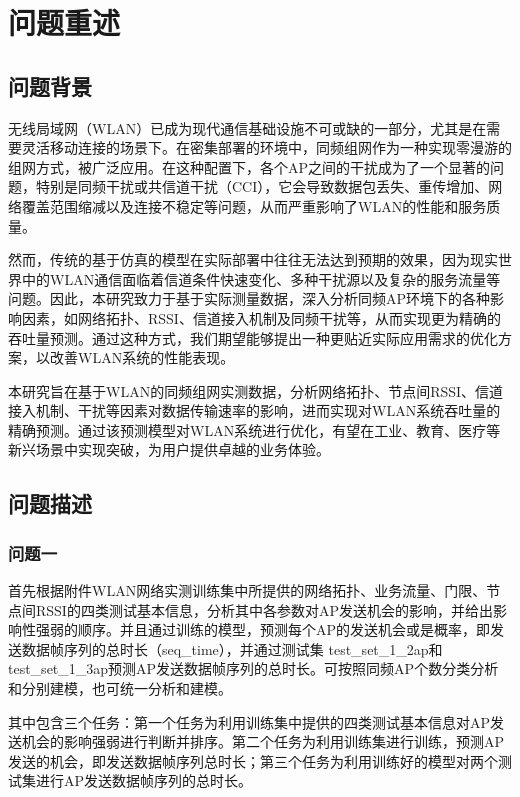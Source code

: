 \section{问题重述}
\subsection{问题背景}   %

无线局域网（WLAN）已成为现代通信基础设施不可或缺的一部分，尤其是在需要灵活移动连接的场景下。在密集部署的环境中，同频组网作为一种实现零漫游的组网方式，被广泛应用。在这种配置下，各个AP之间的干扰成为了一个显著的问题，特别是同频干扰或共信道干扰（CCI），它会导致数据包丢失、重传增加、网络覆盖范围缩减以及连接不稳定等问题，从而严重影响了WLAN的性能和服务质量。

然而，传统的基于仿真的模型在实际部署中往往无法达到预期的效果，因为现实世界中的WLAN通信面临着信道条件快速变化、多种干扰源以及复杂的服务流量等问题。因此，本研究致力于基于实际测量数据，深入分析同频AP环境下的各种影响因素，如网络拓扑、RSSI、信道接入机制及同频干扰等，从而实现更为精确的吞吐量预测。通过这种方式，我们期望能够提出一种更贴近实际应用需求的优化方案，以改善WLAN系统的性能表现。

本研究旨在基于WLAN的同频组网实测数据，分析网络拓扑、节点间RSSI、信道接入机制、干扰等因素对数据传输速率的影响，进而实现对WLAN系统吞吐量的精确预测。通过该预测模型对WLAN系统进行优化，有望在工业、教育、医疗等新兴场景中实现突破，为用户提供卓越的业务体验。

\subsection{问题描述}
\subsubsection{问题一}
首先根据附件WLAN网络实测训练集中所提供的网络拓扑、业务流量、门限、节点间RSSI的四类测试基本信息，分析其中各参数对AP发送机会的影响，并给出影响性强弱的顺序。并且通过训练的模型，预测每个AP的发送机会或是概率，即发送数据帧序列的总时长（seq\_time），并通过测试集 test\_set\_1\_2ap和test\_set\_1\_3ap预测AP发送数据帧序列的总时长。可按照同频AP个数分类分析和分别建模，也可统一分析和建模。

其中包含三个任务：第一个任务为利用训练集中提供的四类测试基本信息对AP发送机会的影响强弱进行判断并排序。第二个任务为利用训练集进行训练，预测AP发送的机会，即发送数据帧序列总时长；第三个任务为利用训练好的模型对两个测试集进行AP发送数据帧序列的总时长。


